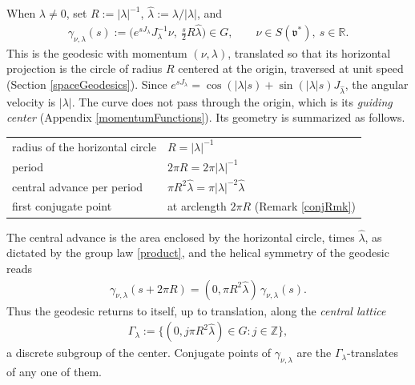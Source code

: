 \documentclass[11pt]{amsart}
\theoremstyle{plain}
\theoremstyle{definition}
\theoremstyle{remark}
\numberwithin{equation}{section}
\def\fv{\mathfrak{v}}
\def\R{{\mathbb R}}%
\def\Z{{\mathbb Z}}%
\numberwithin{equation}{section}
\begin{document}
When $\lambda\neq0$, set $R:=|\lambda|^{-1}$, $\hat\lambda:=\lambda/|\lambda|$, and
\begin{align}\label{param}
	\gamma_{\nu, \lambda}(s):=\Big(e^{sJ_\lambda}J_\lambda^{-1}\nu,\ \tfrac{s}{2}R\hat\lambda\Big)\in G, \qquad \nu\in S(\fv^*),\ s\in \R.
\end{align}
This is the geodesic with momentum $(\nu, \lambda)$, translated so that its horizontal projection is the circle of radius $R$ centered at the origin, traversed at unit speed (Section \ref{spaceGeodesics}). Since $e^{sJ_\lambda}=\cos(|\lambda|s)+\sin(|\lambda|s)J_{\hat\lambda}$, the angular velocity is $|\lambda|$. The curve does not pass through the origin, which is its \textit{guiding center} (Appendix \ref{momentumFunctions}). Its geometry is summarized as follows.
\begin{center}
	\begin{tabular}{ll}
		radius of the horizontal circle & $R=|\lambda|^{-1}$\\
		period & $2\pi R=2\pi|\lambda|^{-1}$\\
		central advance per period & $\pi R^2\hat\lambda=\pi|\lambda|^{-2}\hat\lambda$\\
		first conjugate point & at arclength $2\pi R$ (Remark \ref{conjRmk})
	\end{tabular}
\end{center}
The central advance is the area enclosed by the horizontal circle, times $\hat\lambda$, as dictated by the group law \eqref{product}, and the helical symmetry of the geodesic reads
\begin{align}\label{e:helicalSym}
	\gamma_{\nu, \lambda}(s+2\pi R)=(0, \pi R^2\hat\lambda)\,\gamma_{\nu, \lambda}(s).
\end{align}
Thus the geodesic returns to itself, up to translation, along the \textit{central lattice}
\begin{align*}
	\Gamma_\lambda:=\{(0, j\pi R^2\hat\lambda)\in G: j\in \Z\},
\end{align*}
a discrete subgroup of the center. Conjugate points of $\gamma_{\nu, \lambda}$ are the $\Gamma_\lambda$-translates of any one of them.
\end{document}
